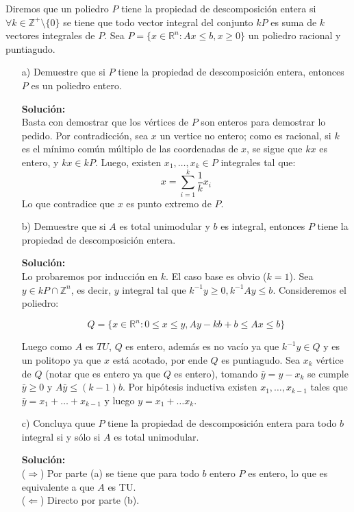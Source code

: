 \documentclass[10pt]{article}
\theoremstyle{plain}
\theoremstyle{definition}
\begin{document}
Diremos que un poliedro $P$ tiene la propiedad de descomposición entera si $\forall k \in \mathbb{Z}^{+}\setminus\{0\}$ se tiene que todo vector integral del conjunto $kP$ es suma de $k$ vectores integrales de $P$. Sea $P=\{x\in\mathbb{R}^{n}: Ax\leq b, x\geq 0\}$ un poliedro racional y puntiagudo.
\begin{itemize}
    \item[a)] Demuestre que si $P$ tiene la propiedad de descomposición entera, entonces $P$ es un poliedro entero.
    
    \textbf{Solución:}\\
    Basta con demostrar que los vértices de $P$ son enteros para demostrar lo pedido. Por contradicción, sea $x$ un vertice no entero; como es racional, si $k$ es el mínimo común múltiplo de las coordenadas de $x$, se sigue que $kx$ es entero, y $kx\in kP$. Luego, existen $x_{1},\ldots, x_{k}\in P$ integrales tal que:
    \begin{equation*}
        x=\sum_{i=1}^{k}\frac{1}{k}x_{i}
    \end{equation*}
    Lo que contradice que $x$ es punto extremo de $P$.
    \item[b)] Demuestre que si $A$ es total unimodular y $b$ es integral, entonces $P$ tiene la propiedad de descomposición entera.
    
    \textbf{Solución:}\\
    Lo probaremos por inducción en $k$. El caso base es obvio ($k=1$). Sea $y\in kP\cap\mathbb{Z}^{n}$, es decir, $y$ integral tal que $k^{-1}y\geq 0, k^{-1}Ay\leq b$. Consideremos el poliedro:

    \begin{equation*}
    Q = \{x\in \mathbb{R}^{n}:0\leq x \leq y,  Ay-kb+b\leq Ax\leq b\} 
    \end{equation*}

    Luego como $A$ es $TU$, $Q$ es entero, además es no vacío ya que $k^{-1}y\in Q$ y es un politopo ya que $x$ está acotado, por ende $Q$ es puntiagudo. Sea $x_{k}$ vértice de $Q$ (notar que es entero ya que $Q$ es entero), tomando $\bar{y}=y-x_{k}$ se cumple $\bar{y}\geq0$ y $A\bar{y}\leq(k-1)b$. Por hipótesis inductiva existen $x_{1},\ldots, x_{k-1}$ tales que $\bar{y}=x_{1}+\ldots+x_{k-1}$ y luego $y=x_{1}+\ldots x_{k}$.

    \item[c)] Concluya quue $P$ tiene la propiedad de descomposición entera para todo $b$ integral si y sólo si $A$ es total unimodular.
    
    \textbf{Solución:}\\
    ($\Longrightarrow$) Por parte (a) se tiene que para todo $b$ entero $P$ es entero, lo que es equivalente a que $A$ es TU.\\
    ($\Longleftarrow$) Directo por parte (b).

\end{itemize}
\end{document}
